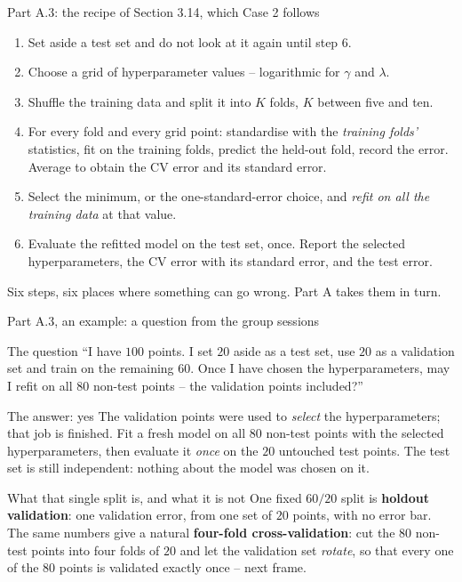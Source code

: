 \documentclass[10pt,aspectratio=169]{beamer}
\begin{document}
\begin{frame}{Part A.3: the recipe of Section 3.14, which Case 2 follows}
\small
\begin{enumerate}
  \item Set aside a test set and do not look at it again until step 6.
  \item Choose a grid of hyperparameter values -- logarithmic for $\gamma$
        and $\lambda$.
  \item Shuffle the training data and split it into $K$ folds, $K$ between
        five and ten.
  \item For every fold and every grid point: standardise with the
        \emph{training folds'} statistics, fit on the training folds,
        predict the held-out fold, record the error.  Average to obtain
        the CV error and its standard error.
  \item Select the minimum, or the one-standard-error choice, and
        \emph{refit on all the training data} at that value.
  \item Evaluate the refitted model on the test set, once.  Report the
        selected hyperparameters, the CV error with its standard error,
        and the test error.
\end{enumerate}
\medskip
Six steps, six places where something can go wrong.  Part A takes them in
turn.
\end{frame}

\begin{frame}{Part A.3, an example: a question from the group sessions}
\small
\begin{block}{The question}
``I have $100$ points.  I set $20$ aside as a test set, use $20$ as a
validation set and train on the remaining $60$.  Once I have chosen the
hyperparameters, may I refit on all $80$ non-test points -- the validation
points included?''
\end{block}
\pause
\begin{block}{The answer: yes}
The validation points were used to \emph{select} the hyperparameters; that
job is finished.  Fit a fresh model on all $80$ non-test points with the
selected hyperparameters, then evaluate it \emph{once} on the $20$ untouched
test points.  The test set is still independent: nothing about the model was
chosen on it.
\end{block}
\pause
\begin{block}{What that single split is, and what it is not}
One fixed $60/20$ split is \textbf{holdout validation}: one validation
error, from one set of $20$ points, with no error bar.  The same numbers
give a natural \textbf{four-fold cross-validation}: cut the $80$ non-test
points into four folds of $20$ and let the validation set \emph{rotate}, so
that every one of the $80$ points is validated exactly once -- next frame.
\end{block}
\end{frame}
\end{document}
